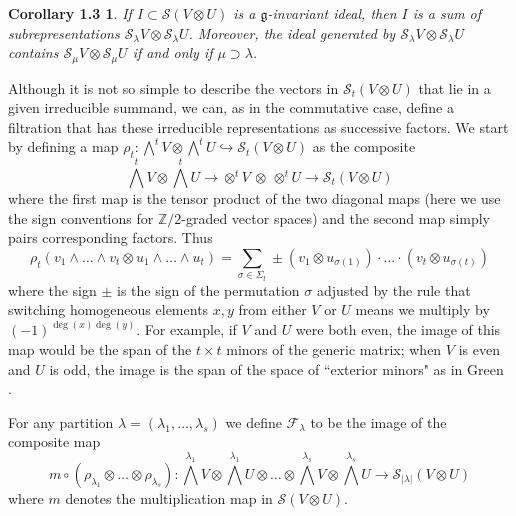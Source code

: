 \documentclass{tran-l}
\theoremstyle{plain}
\newtheorem*{theorem5}{Corollary 1.3}
\theoremstyle{remark}
\theoremstyle{definition}
\newcommand{\g}{{\mathfrak g}}
\newcommand{\myS}{{\mathcal S}}
\newcommand{\F}{{\mathcal F}}
\newcommand{\ZZ}{\mathbb {Z}}
\begin{document}
\begin{theorem5} If $I\subset \myS (V\otimes U)$ is a $\g $-invariant
ideal, then $I$ is a sum of subrepresentations $\myS _{\lambda }V\otimes \myS _{\lambda }U$.
Moreover, the ideal generated by $\myS _{\lambda }V\otimes \myS _{\lambda }U$ contains
$\myS _{\mu }V\otimes \myS _{\mu }U$ if and only if
$\mu \supset \lambda $.
\end{theorem5}


Although it is not so simple to describe the vectors in $\myS _{t}(V\otimes U)$
that lie in a given irreducible summand, we can, as
in the commutative case, define a filtration that has these
irreducible representations as successive factors.
We start by defining a map
$\rho _{t} : \bigwedge ^{t} V\otimes \bigwedge ^{t}
U\hookrightarrow \myS _{t} (V\otimes U)$ as the composite
\begin{equation*}\bigwedge ^{t} V\otimes \bigwedge ^{t}U\to \otimes ^{t}V\ \otimes \ \otimes ^{t}U\to \myS _{t}(V\otimes U)
\end{equation*}
where the first map is the tensor product of the two diagonal maps
(here we use the sign conventions for $\ZZ /2$-graded vector spaces)
and the second map simply pairs corresponding factors. Thus
\begin{equation*}\rho _{t} (v_{1}\wedge \ldots \wedge v_{t}\otimes u_{1}\wedge \ldots \wedge u_{t}
)=\sum _{\sigma \in \Sigma _{t}} \pm (v_{1}\otimes u_{\sigma (1)})\cdot \ldots \cdot (v_{t}\otimes u_{\sigma (t)})
\end{equation*}
 where the sign $\pm $ is the sign of the
permutation $\sigma $ adjusted by
the rule that switching homogeneous elements
$x, y$ from either $V$ or $U$ means we multiply by $(-1)^{\deg(x)\deg(y)}$.
For example, if $V$ and $U$
were both even, the image of this map would be
the span of the $t\times t$ minors of the generic matrix;
when $V$ is even and $U$ is odd, the image is the span of the
space of ``exterior minors" as in Green \cite{Gre}.

For any partition $\lambda =(\lambda _{1},\dots ,\lambda _{s})$
we define  $\F _{\lambda }$ to be
the image of the composite map
\begin{equation*}m\circ (\rho _{\lambda _{1}}\otimes \ldots \otimes \rho _{\lambda _{s}}):\bigwedge ^{\lambda _{1}}
V\otimes \bigwedge ^{\lambda _{1}}U
\otimes \ldots \otimes \bigwedge ^{\lambda _{s}}V\otimes \bigwedge ^{\lambda _{s}}U\rightarrow \myS _{|\lambda | }(V\otimes U)
\end{equation*}
where $m$ denotes the multiplication map in $\myS (V\otimes U)$.
\end{document}
